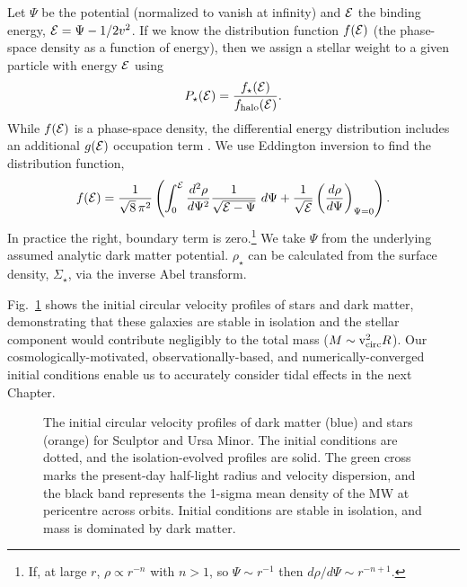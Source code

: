 Let \(\Psi\) be the potential (normalized to vanish at infinity) and
\({\cal E}\) the binding energy, \({\cal E} = \Psi - 1/2 v^2\). If we
know the distribution function \(f({\cal E})\) (the phase-space density
as a function of energy), then we assign a stellar weight to a given
particle with energy \({\cal E}\) using \begin{equation}{
P_\star({\cal E}) = \frac{f_\star({\cal E})}{f_{\rm halo}({\cal E})}.
}\end{equation} While \(f({\cal E})\) is a phase-space density, the
differential energy distribution includes an additional \(g({\cal E})\)
occupation term \citep{BT1987}. We use Eddington inversion to find the
distribution function, \citep[eq. 4-140b in][]{BT1987} \begin{equation}{
f({\cal E}) = \frac{1}{\sqrt{8}\, \pi^2}\left( \int_0^{\cal E} \frac{d^2\rho}{d\Psi^2} \frac{1}{\sqrt{{\cal E} - \Psi}}\ d\Psi + \frac{1}{\sqrt{\cal E}} \left(\frac{d\rho}{d\Psi}\right)_{\Psi=0} \right).
}\end{equation} In practice the right, boundary term is zero.\footnote{If,
  at large \(r\), \(\rho \propto r^{-n}\) with \(n>1\), so
  \(\Psi \sim r^{-1}\) then \(d\rho / d\Psi \sim r^{-n+1}\).} We take
\(\Psi\) from the underlying assumed analytic dark matter potential.
\(\rho_\star\) can be calculated from the surface density,
\(\Sigma_\star\), via the inverse Abel transform.

Fig.~\ref{fig:scl_umi_initial_isolation} shows the initial circular
velocity profiles of stars and dark matter, demonstrating that these
galaxies are stable in isolation and the stellar component would
contribute negligibly to the total mass (\(M \sim {\rm v}_{\rm circ}^2 R\)).
Our cosmologically-motivated, observationally-based, and
numerically-converged initial conditions enable us to accurately
consider tidal effects in the next Chapter.

\begin{figure}
\centering
{}
\caption[Initial halo velocity profiles]{The initial circular velocity
profiles of dark matter (blue) and stars (orange) for Sculptor and Ursa
Minor. The initial conditions are dotted, and the isolation-evolved
profiles are solid. The green cross marks the present-day half-light
radius and velocity dispersion, and the black band represents the
1-sigma mean density of the MW at pericentre across orbits. Initial
conditions are stable in isolation, and mass is dominated by dark
matter.}\label{fig:scl_umi_initial_isolation}
\end{figure}
